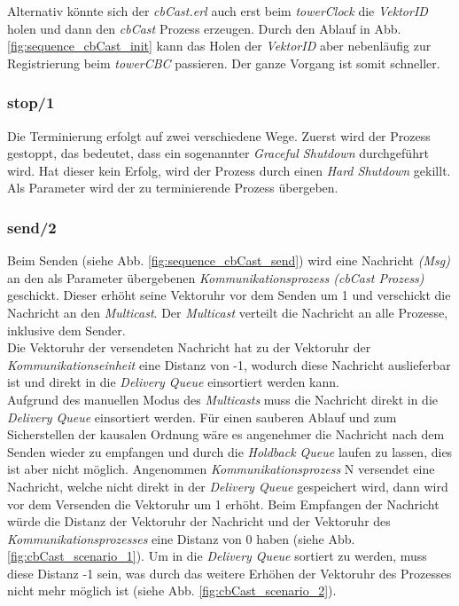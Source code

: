 Alternativ könnte sich der \textit{cbCast.erl} auch erst beim \textit{towerClock} die \textit{VektorID} holen und dann den \textit{cbCast} Prozess erzeugen. Durch den Ablauf in Abb. \ref{fig:sequence_cbCast_init} kann das Holen der \textit{VektorID} aber nebenläufig zur Registrierung beim \textit{towerCBC} passieren. Der ganze Vorgang ist somit schneller.

\subsubsection{stop/1} \label{commModule_stop}

Die Terminierung erfolgt auf zwei verschiedene Wege. Zuerst wird der Prozess gestoppt, das bedeutet, dass ein sogenannter \textit{Graceful Shutdown} durchgeführt wird. Hat dieser kein Erfolg, wird der Prozess durch einen \textit{Hard Shutdown} gekillt.\\
Als Parameter wird der zu terminierende Prozess übergeben.

\subsubsection{send/2} \label{commModule_send}

Beim Senden (siehe Abb. \ref{fig:sequence_cbCast_send}) wird eine Nachricht \textit{(Msg)} an den als Parameter übergebenen \textit{Kommunikationsprozess (cbCast Prozess)} geschickt. Dieser erhöht seine Vektoruhr vor dem Senden um 1 und verschickt die Nachricht an den \textit{Multicast}. Der \textit{Multicast} verteilt die Nachricht an alle Prozesse, inklusive dem Sender.\\
Die Vektoruhr der versendeten Nachricht hat zu der Vektoruhr der \textit{Kommunikationseinheit} eine Distanz von -1, wodurch diese Nachricht auslieferbar ist und direkt in die \textit{Delivery Queue} einsortiert werden kann.\\
Aufgrund des manuellen Modus des \textit{Multicasts} muss die Nachricht direkt in die \textit{Delivery Queue} einsortiert werden. Für einen sauberen Ablauf und zum Sicherstellen der kausalen Ordnung wäre es angenehmer die Nachricht nach dem Senden wieder zu empfangen und durch die \textit{Holdback Queue} laufen zu lassen, dies ist aber nicht möglich. Angenommen \textit{Kommunikationsprozess} N versendet eine Nachricht, welche nicht direkt in der \textit{Delivery Queue} gespeichert wird, dann wird vor dem Versenden die Vektoruhr um 1 erhöht. Beim Empfangen der Nachricht würde die Distanz der Vektoruhr der Nachricht und der Vektoruhr des \textit{Kommunikationsprozesses} eine Distanz von 0 haben (siehe Abb. \ref{fig:cbCast_scenario_1}). Um in die \textit{Delivery Queue} sortiert zu werden, muss diese Distanz -1 sein, was durch das weitere Erhöhen der Vektoruhr des Prozesses nicht mehr möglich ist (siehe Abb. \ref{fig:cbCast_scenario_2}).

